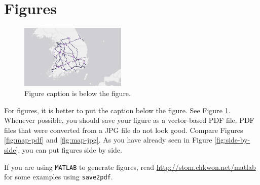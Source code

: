 \documentclass[letterpaper, 11pt]{article}
\begin{document}
\section{Figures} \label{sec:figures}


\begin{figure} \centering
\includegraphics[width=0.45\textwidth]{map}
\caption{Figure caption is below the figure.}
\label{fig:map}
\end{figure}

For figures, it is better to put the caption below the figure. See Figure \ref{fig:map}. Whenever possible, you should save your figure as a vector-based PDF file. PDF files that were converted from a JPG file do not look good. Compare Figures \ref{fig:map-pdf} and \ref{fig:map-jpg}. As you have already seen in Figure \ref{fig:side-by-side}, you can put figures side by side.

If you are using \texttt{MATLAB} to generate figures, read \url{http://stom.chkwon.net/matlab} for some examples using \texttt{save2pdf}.
\end{document}
